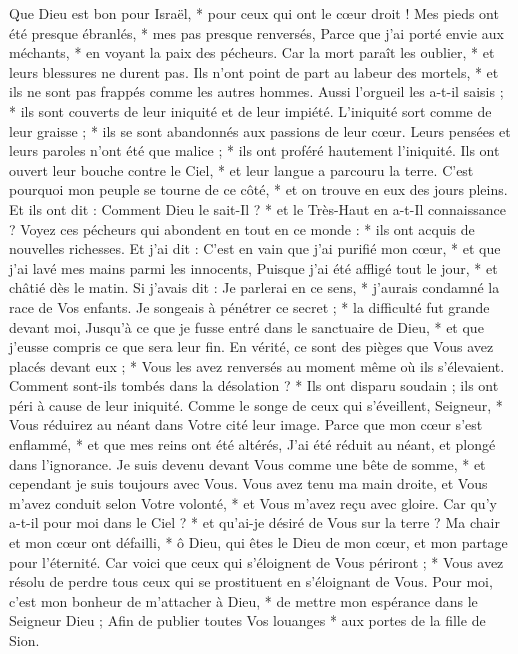  Que Dieu est bon pour Israël, * pour ceux qui ont le cœur droit !
\versseparator
 Mes pieds ont été presque ébranlés, * mes pas presque renversés,
\versseparator
 Parce que j'ai porté envie aux méchants, * en voyant la paix des pécheurs.
\versseparator
 Car la mort paraît les oublier, * et leurs blessures ne durent pas.
\versseparator
 Ils n'ont point de part au labeur des mortels, * et ils ne sont pas frappés comme les autres hommes.
\versseparator
 Aussi l'orgueil les a-t-il saisis ; * ils sont couverts de leur iniquité et de leur impiété.
\versseparator
 L'iniquité sort comme de leur graisse ; * ils se sont abandonnés aux passions de leur cœur.
\versseparator
 Leurs pensées et leurs paroles n'ont été que malice ; * ils ont proféré hautement l'iniquité.
\versseparator
 Ils ont ouvert leur bouche contre le Ciel, * et leur langue a parcouru la terre.
\versseparator
 C'est pourquoi mon peuple se tourne de ce côté, * et on trouve en eux des jours pleins.
\versseparator
 Et ils ont dit : Comment Dieu le sait-Il ? * et le Très-Haut en a-t-Il connaissance ?
\versseparator
 Voyez ces pécheurs qui abondent en tout en ce monde : * ils ont acquis de nouvelles richesses.
\versseparator
 Et j'ai dit : C'est en vain que j'ai purifié mon cœur, * et que j'ai lavé mes mains parmi les innocents,
\versseparator
 Puisque j'ai été affligé tout le jour, * et châtié dès le matin.
\versseparator
 Si j'avais dit : Je parlerai en ce sens, * j'aurais condamné la race de Vos enfants.
\versseparator
 Je songeais à pénétrer ce secret ; * la difficulté fut grande devant moi,
\versseparator
 Jusqu'à ce que je fusse entré dans le sanctuaire de Dieu, * et que j'eusse compris ce que sera leur fin.
\versseparator
 En vérité, ce sont des pièges que Vous avez placés devant eux ; * Vous les avez renversés au moment même où ils s'élevaient.
\versseparator
 Comment sont-ils tombés dans la désolation ? * Ils ont disparu soudain ; ils ont péri à cause de leur iniquité.
\versseparator
 Comme le songe de ceux qui s'éveillent, Seigneur, * Vous réduirez au néant dans Votre cité leur image.
\versseparator
 Parce que mon cœur s'est enflammé, * et que mes reins ont été altérés,
\versseparator
 J'ai été réduit au néant, et plongé dans l'ignorance. Je suis devenu devant Vous comme une bête de somme, * et cependant je suis toujours avec Vous.
\versseparator
 Vous avez tenu ma main droite, et Vous m'avez conduit selon Votre volonté, * et Vous m'avez reçu avec gloire.
\versseparator
 Car qu'y a-t-il pour moi dans le Ciel ? * et qu'ai-je désiré de Vous sur la terre ?
\versseparator
 Ma chair et mon cœur ont défailli, * ô Dieu, qui êtes le Dieu de mon cœur, et mon partage pour l'éternité.
\versseparator
 Car voici que ceux qui s'éloignent de Vous périront ; * Vous avez résolu de perdre tous ceux qui se prostituent en s'éloignant de Vous.
\versseparator
 Pour moi, c'est mon bonheur de m'attacher à Dieu, * de mettre mon espérance dans le Seigneur Dieu ;
\versseparator
 Afin de publier toutes Vos louanges * aux portes de la fille de Sion.